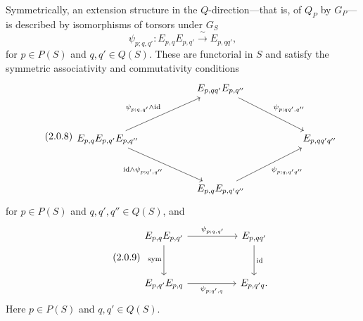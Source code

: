 
Symmetrically, an extension structure in the $Q$-direction---that is,
of $Q_P$ by $G_P$---is described by isomorphisms of torsors under $G_S$
\begin{equation}\tag{2.0.7}
 \psi_{p;q,q'}:E_{p,q}E_{p,q'}
 \xrightarrow{\ \sim\ }E_{p,qq'},
\end{equation}
for $p\in P(S)$ and $q,q'\in Q(S)$. These are functorial in $S$ and
satisfy the symmetric associativity and commutativity conditions
\begin{equation}\tag{2.0.8}
\begin{tikzcd}[column sep=5.1em,row sep=3.4em]
 & E_{p,qq'}E_{p,q''}
   \arrow[rd,"{\psi_{p;qq',q''}}"] & \\
 E_{p,q}E_{p,q'}E_{p,q''}
   \arrow[ru,"{\psi_{p;q,q'}\wedge\mathrm{id}}"]
   \arrow[rd,"{\mathrm{id}\wedge\psi_{p;q',q''}}"']
 && E_{p,qq'q''} \\
 & E_{p,q}E_{p,q'q''}
   \arrow[ru,"{\psi_{p;q,q'q''}}"'] &
\end{tikzcd}
\end{equation}
for $p\in P(S)$ and $q,q',q''\in Q(S)$, and
\begin{equation}\tag{2.0.9}
\begin{tikzcd}[column sep=5em,row sep=3.1em]
 E_{p,q}E_{p,q'} \arrow[r,"{\psi_{p;q,q'}}"]
   \arrow[d,"\mathrm{sym}"']
 & E_{p,qq'} \arrow[d,"\mathrm{id}"] \\
 E_{p,q'}E_{p,q} \arrow[r,"{\psi_{p;q',q}}"']
 & E_{p,q'q}.
\end{tikzcd}
\end{equation}
Here $p\in P(S)$ and $q,q'\in Q(S)$.


